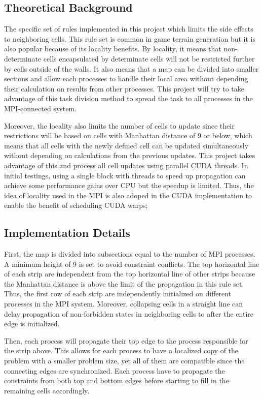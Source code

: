 \subsection{Theoretical Background}
The specific set of rules implemented in this project which limits the side effects to neighboring cells. This rule set is common in game terrain generation but it is also popular because of its locality benefits. 
By locality, it means that non-determinate cells encapsulated by determinate cells will not be restricted further by cells outside of the walls. 
It also means that a map can be divided into smaller sections and allow each processes to handle their local area without depending their calculation on results from other processes. This project will try to take advantage of this task division method to spread the task to all processes in the MPI-connected system.

Moreover, the locality also limits the number of cells to update since their restrictions will be based on cells with Manhattan distance of 9 or below, which means that all cells with the newly defined cell can be updated simultaneously without depending on calculations from the previous updates. This project takes advantage of this and process all cell updates using parallel CUDA threads. In initial testings, using a single block with threads to speed up propagation can achieve some performance gains over CPU but the speedup is limited. Thus, the idea of locality used in the MPI is also adoped in the CUDA implementation to enable the benefit of scheduling CUDA warps;


\subsection{Implementation Details}

First, the map is divided into subsections equal to the number of MPI processes. A minimum height of 9 is set to avoid constraint conflicts. The top horizontal line of each strip are independent from the top horizontal line of other strips because the Manhattan distance is above the limit of the propagation in this rule set.
Thus, the first row of each strip are independently initialized on different processes in the MPI system. Moreover, collapsing cells in a straight line can delay propagation of non-forbidden states in neighboring cells to after the entire edge is initialized.

Then, each process will propagate their top edge to the process responsible for the strip above. This allows for each process to have a localized copy of the problem with a smaller problem size, yet all of them are compatible since the connecting edges are synchronized. Each process have to propagate the constraints from both top and bottom edges before starting to fill in the remaining cells accordingly. 

